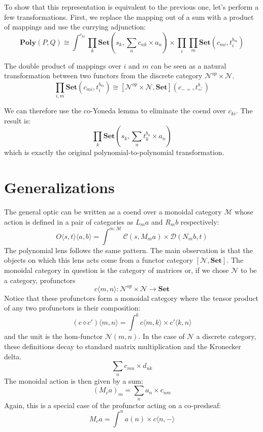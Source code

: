 \documentclass[11pt]{amsart}
\begin{document}
 
To show that this representation is equivalent to the previous one, let's perform a few transformations. First, we replace the mapping out of a sum with a product of mappings and use the currying adjunction:
\[ \mathbf{Poly}(P, Q) \cong \int^{c_{k i}} \prod_k  \mathbf{Set} \left(s_k, \sum_n c_{n k} \times a_n\right) \times  \prod_i  \prod_m \mathbf{Set} \left( c_{m i}, t_i^{b_m} \right) \]

 The double product of mappings over $i$ and $m$ can be seen as a natural transformation between two functors from the discrete category $\mathcal{N}^{op} \times \mathcal{N}$. 
  \[ \prod_{i, m}  \mathbf{Set} \left( c_{m i}, t_i^{b_m} \right) \cong [\mathcal{N}^{op} \times \mathcal{N}, \mathbf{Set}](c_{-=}, t_=^{b_{-}} )\]

 
 We can therefore use the co-Yoneda lemma to eliminate the coend over $c_{ki}$. The result is:
 \[ \prod_k \mathbf{Set}\left(s_k, \sum_n t_k^{b_n} \times a_n \right) \]
which is exactly the original polynomial-to-polynomial transformation.

\section{Generalizations}

The general optic can be written as a coend over a monoidal category $\mathcal{M}$ whose action is defined in a pair of categories as $L_m a$ and $R_m b$ respectively:
\[ O \langle s, t \rangle \langle a, b \rangle = \int^{m \colon \mathcal{M} } \mathcal{C} (s, M_m a) \times  \mathcal{D} (N_m b, t) \]
The polynomial lens follows the same pattern. The main observation is that the objects on which this lens acts come from a functor category $[\mathcal{N}, \mathbf{Set}]$. The monoidal category in question is the category of matrices or, if we chose $\mathcal{N}$ to be a category, profunctors 
\[ c \langle m, n \rangle \colon \mathcal{N}^{op} \times \mathcal{N} \to \mathbf{Set} \]
Notice that these profunctors form a monoidal category where the tensor product of any two profunctors is their composition:
\[ (c \diamond c') \langle m, n \rangle = \int^k c \langle m, k \rangle \times c' \langle k, n \rangle \]
and the unit is the hom-functor $\mathcal{N}(m, n)$. In the case of $\mathcal{N}$ a discrete category, these definitions decay to standard matrix multiplication and the Kronecker delta.
\[ \sum_n c_{m n} \times d_{n k} \]
The monoidal action is then given by a sum:
\[ (M_{c} a)_m = \sum_n a_n \times c_{ n m} \]
Again, this is a special case of the profunctor acting on a co-presheaf:
\[ M_c a = \int^n a(n) \times c \langle n, - \rangle \]
\end{document}
